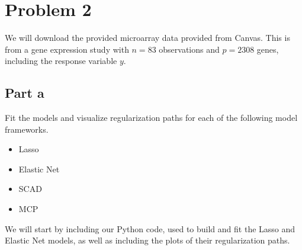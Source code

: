 \documentclass[12pt, letterpaper]{article}
\begin{document}
\section{Problem 2} 

We will download the provided microarray data provided from Canvas. This is from a gene expression study with $n = 83$ observations and $p = 2308$ genes, including the response variable $y$. 

\subsection{Part a}

Fit the models and visualize regularization paths for each of the following model frameworks. 

\begin{itemize}
\item Lasso 
\item Elastic Net 
\item SCAD
\item MCP
\end{itemize}

We will start by including our Python code, used to build and fit the Lasso and Elastic Net models, as well as including the plots of their regularization paths. 
\end{document}
